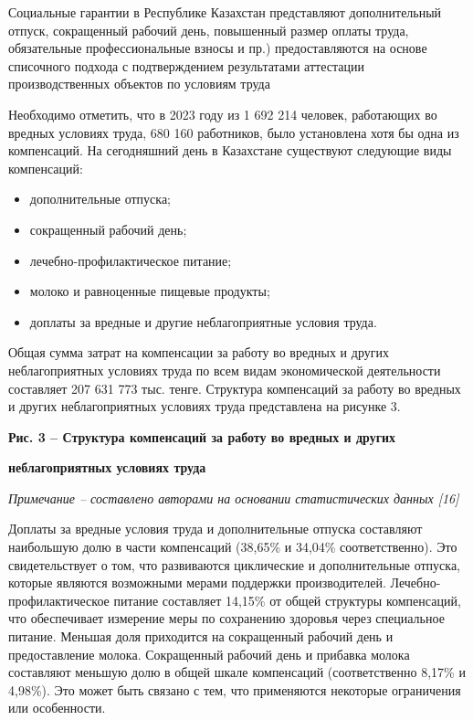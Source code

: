 Социальные гарантии в Республике Казахстан представляют дополнительный
отпуск, сокращенный рабочий день, повышенный размер оплаты труда,
обязательные профессиональные взносы и пр.) предоставляются на основе
списочного подхода с подтверждением результатами аттестации
производственных объектов по условиям труда

Необходимо отметить, что в 2023 году из 1 692 214 человек, работающих во
вредных условиях труда, 680 160 работников, было установлена хотя бы
одна из компенсаций. На сегодняшний день в Казахстане существуют
следующие виды компенсаций:

\begin{itemize}
\item
  дополнительные отпуска;
\item
  сокращенный рабочий день;
\item
  лечебно-профилактическое питание;
\item
  молоко и равноценные пищевые продукты;
\item
  доплаты за вредные и другие неблагоприятные условия труда.
\end{itemize}

Общая сумма затрат на компенсации за работу во вредных и других
неблагоприятных условиях труда по всем видам экономической деятельности
составляет 207 631 773 тыс. тенге. Структура компенсаций за работу во
вредных и других неблагоприятных условиях труда представлена на рисунке
3.

{\bfseries Рис. 3 -- Структура компенсаций за работу во вредных и других}

{\bfseries неблагоприятных условиях труда}

\emph{Примечание -- составлено авторами на основании статистических
данных {[}16{]}}

Доплаты за вредные условия труда и дополнительные отпуска составляют
наибольшую долю в части компенсаций (38,65\% и 34,04\% соответственно).
Это свидетельствует о том, что развиваются циклические и дополнительные
отпуска, которые являются возможными мерами поддержки производителей.
Лечебно-профилактическое питание составляет 14,15\% от общей структуры
компенсаций, что обеспечивает измерение меры по сохранению здоровья
через специальное питание. Меньшая доля приходится на сокращенный
рабочий день и предоставление молока. Сокращенный рабочий день и
прибавка молока составляют меньшую долю в общей шкале компенсаций
(соответственно 8,17\% и 4,98\%). Это может быть связано с тем, что
применяются некоторые ограничения или особенности.

